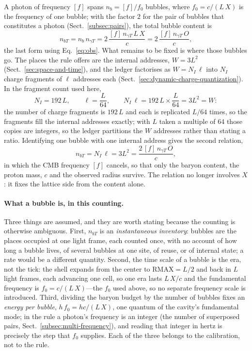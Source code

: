 \documentclass[a4paper]{article}
\begin{document}
A photon of frequency $[f]$ spans $n_{b}=[f]/f_{0}$ bubbles, where $f_{0}=c/(L\,X)$ is the frequency of one bubble; with the factor $2$ for the pair of bubbles that constitutes a photon (Sect.~\ref{subsec:pairs}), the total bubble content is
\[
n_{bT}=n_{b}\,n_{\gamma T}
=2\,\frac{[f]\,n_{\gamma T}\,L\,X}{c}
=2\,\frac{[f]\,n_{\gamma T}\,O}{c},
\]
the last form using Eq.~\eqref{eq:obs}.  What remains to be fixed is where those bubbles go.  The places the rule offers are the internal addresses, $W=3L^{2}$ (Sect.~\ref{sec:space-and-time}), and the ledger factorises as $W=N_I\,\ell$ into $N_I$ charge fragments of $\ell$ addresses each (Sect.~\ref{sec:dynamic-charge-quantization}).  In the fragment count used here,
\[
N_I=192\,L,\qquad
\ell=\frac{L}{64},
\qquad
N_I\,\ell=192\,L\times\frac{L}{64}=3L^{2}=W:
\]
the number of charge fragments is $192\,L$ and each is replicated $L/64$ times, so the fragments fill the internal addresses exactly; with $L$ taken a multiple of 64 those copies are integers, so the ledger partitions the $W$ addresses rather than stating a ratio.  Identifying one bubble with one internal address gives the second relation,
\begin{equation}
n_{bT}=N_I\,\ell=3L^{2}=\frac{2\,[f]\,n_{\gamma T}\,O}{c},
\label{eq:content}
\end{equation}
in which the CMB frequency $[f]$ cancels, so that only the baryon content, the proton mass, $c$ and the observed radius survive.  The relation no longer involves $X$: it fixes the lattice side from the content alone.

\paragraph{What a bubble is, in this counting.}  Three things are assumed, and they are worth stating because the counting is otherwise ambiguous.  First, $n_{bT}$ is an \emph{instantaneous inventory}: bubbles are the places occupied at one light frame, each counted once, with no account of how long a bubble lives, of several bubbles at one site, of reuse, or of internal state; a rate would be a different quantity.  Second, the time scale of a bubble is the era, not the tick: the shell expands from the center to $\mathrm{RMAX}=L/2$ and back in $L$ light frames, each advancing one cell, so one era lasts $L\,X/c$ and the fundamental frequency is $f_{0}=c/(L\,X)$---the $f_{0}$ used above, so no separate frequency scale is introduced.  Third, dividing the baryon budget by the number of bubbles fixes an \emph{energy per bubble}, $h\,f_{0}=hc/(L\,X)$, one quantum of the cavity's fundamental mode; in the rule a photon's frequency is an integer (the number of superposed pairs, Sect.~\ref{subsec:multi-frequency}), and reading that integer in hertz is precisely the step that $f_{0}$ supplies.  Each of the three belongs to the calibration, not to the rule.
\end{document}
